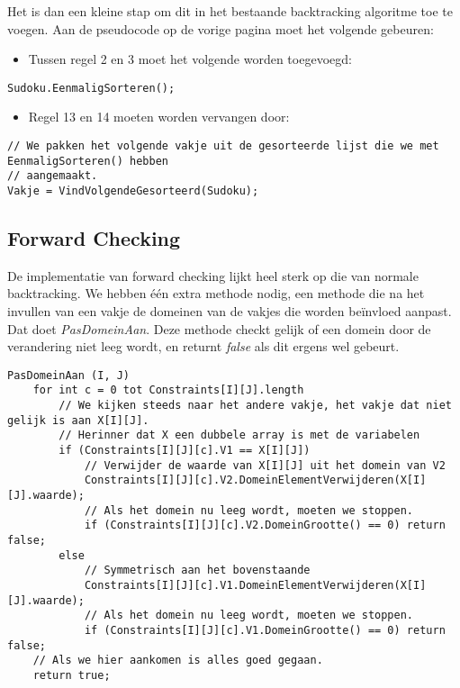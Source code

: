 \documentclass[]{report}
\begin{document}
Het is dan een kleine stap om dit in het bestaande backtracking algoritme toe te voegen. Aan de pseudocode op de vorige pagina moet het volgende gebeuren:
\begin{itemize}
\item Tussen regel 2 en 3 moet het volgende worden toegevoegd:
\end{itemize}
\begin{minipage}{\textwidth}
\begin{lstlisting}
Sudoku.EenmaligSorteren();
\end{lstlisting}
\end{minipage}
\begin{itemize}
\item Regel 13 en 14 moeten worden vervangen door:
\end{itemize}
\begin{minipage}{\textwidth}
\begin{lstlisting}
// We pakken het volgende vakje uit de gesorteerde lijst die we met EenmaligSorteren() hebben 
// aangemaakt.
Vakje = VindVolgendeGesorteerd(Sudoku);
\end{lstlisting}
\end{minipage}

\subsection{Forward Checking}
De implementatie van forward checking lijkt heel sterk op die van normale backtracking. We hebben \'{e}\'{e}n extra methode nodig, een methode die na het invullen van een vakje de domeinen van de vakjes die worden be\"{i}nvloed aanpast. Dat doet \textit{PasDomeinAan}. Deze methode checkt gelijk of een domein door de verandering niet leeg wordt, en returnt \textit{false} als dit ergens wel gebeurt.

\begin{minipage}{\textwidth}
\begin{lstlisting}
PasDomeinAan (I, J)
	for int c = 0 tot Constraints[I][J].length
		// We kijken steeds naar het andere vakje, het vakje dat niet gelijk is aan X[I][J].
		// Herinner dat X een dubbele array is met de variabelen
		if (Constraints[I][J][c].V1 == X[I][J])
			// Verwijder de waarde van X[I][J] uit het domein van V2
			Constraints[I][J][c].V2.DomeinElementVerwijderen(X[I][J].waarde);
			// Als het domein nu leeg wordt, moeten we stoppen.
			if (Constraints[I][J][c].V2.DomeinGrootte() == 0) return false;
		else
			// Symmetrisch aan het bovenstaande
			Constraints[I][J][c].V1.DomeinElementVerwijderen(X[I][J].waarde);
			// Als het domein nu leeg wordt, moeten we stoppen.
			if (Constraints[I][J][c].V1.DomeinGrootte() == 0) return false;
	// Als we hier aankomen is alles goed gegaan.
	return true;
\end{lstlisting}
\end{minipage}
\end{document}
